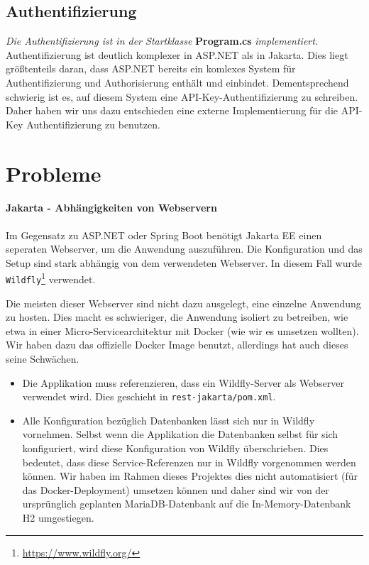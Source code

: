 \subsection{Authentifizierung}

\textit{Die Authentifizierung ist in der Startklasse} \textbf{Program.cs} \textit{implementiert.}\\

Authentifizierung ist deutlich komplexer in ASP.NET als in Jakarta. Dies liegt größtenteils daran,
dass ASP.NET bereits ein komlexes System für Authentifizierung und Authorisierung enthält und einbindet. 
Dementsprechend schwierig ist es, auf diesem System eine API-Key-Authentifizierung zu schreiben. 
Daher haben wir uns dazu entschieden eine externe Implementierung für die API-Key Authentifizierung zu benutzen.

\section{Probleme}

\paragraph{Jakarta - Abhängigkeiten von Webservern}

Im Gegensatz zu ASP.NET oder Spring Boot benötigt Jakarta EE einen seperaten Webserver, um die Anwendung auszuführen. 
Die Konfiguration und das Setup sind stark abhängig von dem verwendeten Webserver. 
In diesem Fall wurde \texttt{Wildfly}\footnote{\url{https://www.wildfly.org/}} verwendet.

Die meisten dieser Webserver sind nicht dazu ausgelegt, eine einzelne Anwendung zu hosten.
Dies macht es schwieriger, die Anwendung isoliert zu betreiben, 
wie etwa in einer Micro-Servicearchitektur mit Docker (wie wir es umsetzen wollten).
Wir haben dazu das offizielle  Docker Image benutzt,
 allerdings hat auch dieses seine Schwächen.

\begin{itemize}
    \item Die Applikation muss referenzieren, dass ein Wildfly-Server als Webserver verwendet wird.
     Dies geschieht in \texttt{rest-jakarta/pom.xml}.
    \item Alle Konfiguration bezüglich Datenbanken lässt sich nur in Wildfly vornehmen.
     Selbst wenn die Applikation die Datenbanken selbst für sich konfiguriert, wird diese Konfiguration von Wildfly überschrieben.
     Dies bedeutet, dass diese Service-Referenzen nur in Wildfly vorgenommen werden können.
     Wir haben im Rahmen dieses Projektes dies nicht automatisiert (für das Docker-Deployment) umsetzen können
     und daher sind wir von der ursprünglich geplanten MariaDB-Datenbank auf die In-Memory-Datenbank H2 umgestiegen.
\end{itemize}
